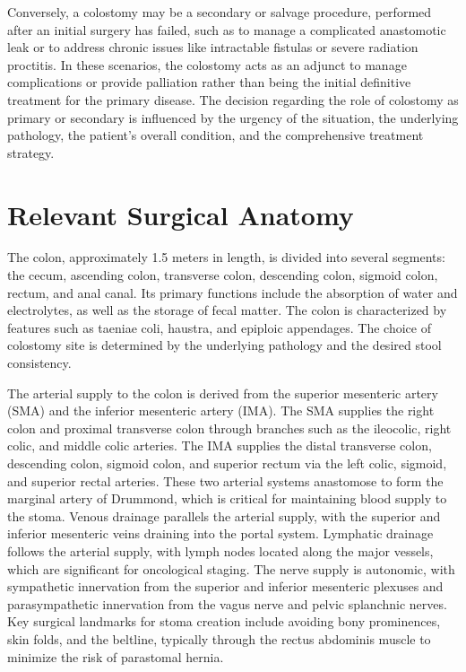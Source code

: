 Conversely, a colostomy may be a secondary or salvage procedure, performed after an initial surgery has failed, such as to manage a complicated anastomotic leak or to address chronic issues like intractable fistulas or severe radiation proctitis. In these scenarios, the colostomy acts as an adjunct to manage complications or provide palliation rather than being the initial definitive treatment for the primary disease. The decision regarding the role of colostomy as primary or secondary is influenced by the urgency of the situation, the underlying pathology, the patient's overall condition, and the comprehensive treatment strategy.

\section*{Relevant Surgical Anatomy}
The colon, approximately 1.5 meters in length, is divided into several segments: the cecum, ascending colon, transverse colon, descending colon, sigmoid colon, rectum, and anal canal. Its primary functions include the absorption of water and electrolytes, as well as the storage of fecal matter. The colon is characterized by features such as taeniae coli, haustra, and epiploic appendages. The choice of colostomy site is determined by the underlying pathology and the desired stool consistency. 

The arterial supply to the colon is derived from the superior mesenteric artery (SMA) and the inferior mesenteric artery (IMA). The SMA supplies the right colon and proximal transverse colon through branches such as the ileocolic, right colic, and middle colic arteries. The IMA supplies the distal transverse colon, descending colon, sigmoid colon, and superior rectum via the left colic, sigmoid, and superior rectal arteries. These two arterial systems anastomose to form the marginal artery of Drummond, which is critical for maintaining blood supply to the stoma. Venous drainage parallels the arterial supply, with the superior and inferior mesenteric veins draining into the portal system. Lymphatic drainage follows the arterial supply, with lymph nodes located along the major vessels, which are significant for oncological staging. The nerve supply is autonomic, with sympathetic innervation from the superior and inferior mesenteric plexuses and parasympathetic innervation from the vagus nerve and pelvic splanchnic nerves. Key surgical landmarks for stoma creation include avoiding bony prominences, skin folds, and the beltline, typically through the rectus abdominis muscle to minimize the risk of parastomal hernia.

